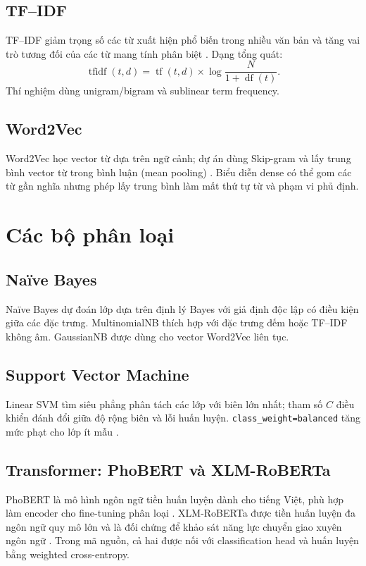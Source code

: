 \subsection{TF--IDF}
TF--IDF giảm trọng số các từ xuất hiện phổ biến trong nhiều văn bản và tăng vai trò tương đối của các từ mang tính phân biệt \cite{manning2008ir}. Dạng tổng quát:
\[
  \operatorname{tfidf}(t,d)=\operatorname{tf}(t,d)\times
  \log\frac{N}{1+\operatorname{df}(t)}.
\]
Thí nghiệm dùng unigram/bigram và sublinear term frequency.

\subsection{Word2Vec}
Word2Vec học vector từ dựa trên ngữ cảnh; dự án dùng Skip-gram và lấy trung bình vector từ trong bình luận (mean pooling) \cite{mik1989w2v}. Biểu diễn dense có thể gom các từ gần nghĩa nhưng phép lấy trung bình làm mất thứ tự từ và phạm vi phủ định.

\section{Các bộ phân loại}
\subsection{Naïve Bayes}
Naïve Bayes dự đoán lớp dựa trên định lý Bayes với giả định độc lập có điều kiện giữa các đặc trưng. MultinomialNB thích hợp với đặc trưng đếm hoặc TF--IDF không âm. GaussianNB được dùng cho vector Word2Vec liên tục.

\subsection{Support Vector Machine}
Linear SVM tìm siêu phẳng phân tách các lớp với biên lớn nhất; tham số $C$ điều khiển đánh đổi giữa độ rộng biên và lỗi huấn luyện. \texttt{class_weight=balanced} tăng mức phạt cho lớp ít mẫu \cite{cortes1995svm}.

\subsection{Transformer: PhoBERT và XLM-RoBERTa}
PhoBERT là mô hình ngôn ngữ tiền huấn luyện dành cho tiếng Việt, phù hợp làm encoder cho fine-tuning phân loại \cite{nguyen2020phobert}. XLM-RoBERTa được tiền huấn luyện đa ngôn ngữ quy mô lớn và là đối chứng để khảo sát năng lực chuyển giao xuyên ngôn ngữ \cite{conneau2020xlmr}. Trong mã nguồn, cả hai được nối với classification head và huấn luyện bằng weighted cross-entropy.

